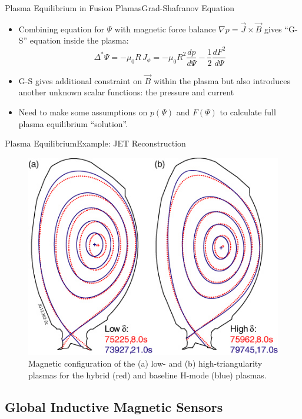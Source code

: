 \documentclass{beamer}
\begin{document}
\begin{frame}{Plasma Equilibrium in Fusion Plamas}{Grad-Shafranov Equation}
  \begin{itemize}
	 \item Combining equation for $\Psi$ with magnetic force balance  $\nabla p = \vec{J} \times \vec{B} $ gives “G-S”  equation inside the plasma: %
		$$ \Delta^* \Psi = -\mu_0 R\, J_\phi=  -\mu_0 R^2  \frac{d p}{d \Psi} -  \frac{1}{2}  \frac{d F^2}{d \Psi}  $$
	\item G-S gives additional constraint on  $ \vec{B}$ within the plasma but also introduces another unknown scalar  functions:  the \alert{ pressure}  and \alert{current}
	\item Need to make some assumptions on $p(\Psi)$  and $F(\Psi)$ to calculate full plasma equilibrium “solution”.
  \end{itemize}

\end{frame}

\begin{frame}{Plasma Equilibrium}{Example: JET Reconstruction}
	\begin{figure}[ht]
	\begin{center}
		\includegraphics[width=.55\columnwidth]{JET_magFlux.jpg}
		\caption{\tiny  Magnetic configuration of the (a) low- and (b) high-triangularity plasmas for the hybrid (red) and baseline H-mode (blue) plasmas.}
	\end{center}
	\end{figure}
\end{frame}

\subsection{Global Inductive Magnetic Sensors }
\end{document}
